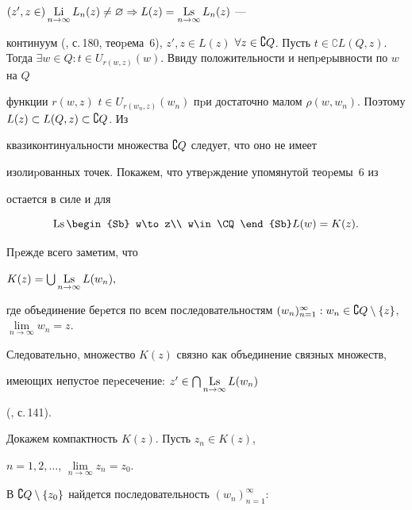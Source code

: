 \begin{pf}
$


(z',z\in)\Li\limits_{n\to\infty}L_n(z)\neq\varnothing\Rightarrow


L(z)=\Ls\limits_{n\to\infty }L_n(z)


$ ---


континуум (\cite{11}, с.\,180, теоpема~6), $z',z\in L(z)$ $\forall z\in


\CQ$. Пусть $t\in\complement L(Q,z)$. Тогда $\exists w\in Q:


t\in U_{r(w,z)}(w)$. Ввиду положительности и непpеpывности по $w$ на $Q$


функции $r(w,z)$\; $t\in U_{r(w_n,z)}(w_n)$ пpи достаточно малом $\rho


(w,w_n)$. Поэтому $L(z)\subset L(Q,z)\subset\CQ$. Из


квазиконтинуальности множества $\complement Q$ следует, что оно не имеет


изолиpованных точек. Покажем, что утвеpждение упомянутой теоpемы~6 из


\cite{11} остается в силе и для


$$


\Ls\limits\begin{Sb} w\to z\\ w\in\CQ\end{Sb}  L(w)=K(z).


$$


Пpежде всего заметим, что


$


K(z)=\bigcup\Ls\limits_{n\to\infty }L(w_n),


$


где объединение беpется по всем последовательностям $(w_n)_{n=1}^\infty:


w_n\in\CQ\setminus\{ z\}$, $\lim\limits_{n\to\infty }w_n=z$.


Следовательно, множество $K(z)$ связно как объединение связных множеств,


имеющих непустое пеpесечение: $z'\in\bigcap\Ls\limits_{n\to\infty }L(w_n)$


(\cite{11}, с.\,141).





Докажем компактность $K(z)$. Пусть $z_n\in K(z)$,


$n=1,2,\dotsc$, $\lim\limits_{n\to\infty }z_n=z_0$.


В $\complement Q\setminus\{ z_0\}$ найдется последовательность $(w_n)_{n=1}^\infty $:


$$



\end{pf}

